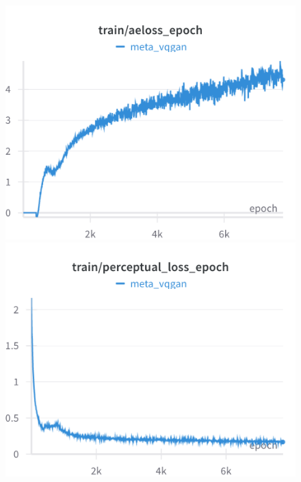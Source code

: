 \begin{figure}[H]
\includegraphics[width=\linewidth]{detailed_engineering/Meta VQGAN/charts/Section-2-Panel-6-6l0wafcc6}
\caption{}
\endminipage\hfill
{}
\includegraphics[width=\linewidth]{detailed_engineering/Meta VQGAN/charts/Section-2-Panel-7-jxu137h9u}
\caption{}
\endminipage
\end{figure}

